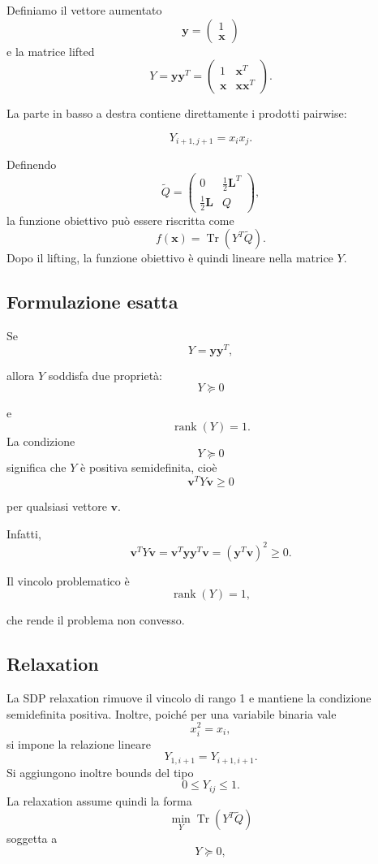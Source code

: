 \documentclass[11pt,a4paper]{report}
\begin{document}
Definiamo il vettore aumentato
\[
\mathbf y
=
\begin{pmatrix}
1\\
\mathbf x
\end{pmatrix}
\]
e la matrice lifted
\[
Y
=
\mathbf y\mathbf y^T
=
\begin{pmatrix}
1 & \mathbf x^T\\
\mathbf x & \mathbf x\mathbf x^T
\end{pmatrix}.
\]

La parte in basso a destra contiene direttamente i prodotti pairwise:

\[
Y_{i+1,j+1}
=
x_i x_j.
\]

Definendo
\[
\widetilde Q
=
\begin{pmatrix}
0 & \frac{1}{2}\mathbf L^T\\
\frac{1}{2}\mathbf L & Q
\end{pmatrix},
\]
la funzione obiettivo può essere riscritta come
\[
f(\mathbf x)
=
\operatorname{Tr}
\left(
Y^T\widetilde Q
\right).
\]
Dopo il lifting, la funzione obiettivo è quindi lineare nella matrice
$Y$.

\subsection{Formulazione esatta}

Se
\[
Y
=
\mathbf y\mathbf y^T,
\]

allora $Y$ soddisfa due proprietà:
\[
Y\succeq0
\]

e
\[
\operatorname{rank}(Y)=1.
\]
La condizione
\[
Y\succeq0
\]
significa che $Y$ è positiva semidefinita, cioè
\[
\mathbf v^T Y \mathbf v
\geq0
\]

per qualsiasi vettore $\mathbf v$.  

Infatti,
\[
\mathbf v^TY\mathbf v
=
\mathbf v^T\mathbf y\mathbf y^T\mathbf v
=
(\mathbf y^T\mathbf v)^2
\geq0.
\]

Il vincolo problematico è
\[
\operatorname{rank}(Y)=1,
\]

che rende il problema non convesso.

\subsection{Relaxation}

La SDP relaxation rimuove il vincolo di rango 1 e mantiene la condizione
semidefinita positiva. Inoltre, poiché per una variabile binaria vale
\[
x_i^2=x_i,
\]
si impone la relazione lineare
\[
Y_{1,i+1}
=
Y_{i+1,i+1}.
\]
Si aggiungono inoltre bounds del tipo
\[
0\leq Y_{ij}\leq1.
\]
La relaxation assume quindi la forma
\[
\min_Y
\operatorname{Tr}
\left(
Y^T\widetilde Q
\right)
\]
soggetta a
\[
Y\succeq0,
\]
\end{document}
